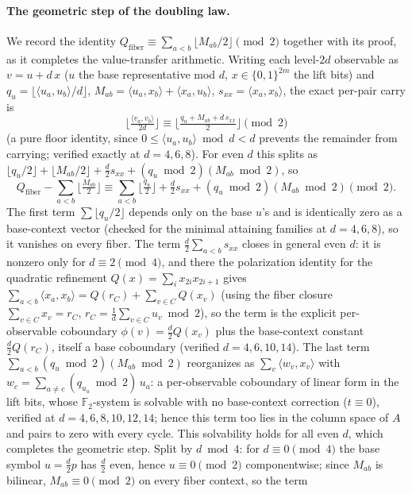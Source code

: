 \documentclass[11pt]{article}
\theoremstyle{remark}
\newcommand{\F}{\mathbb{F}}
\newcommand{\ip}[2]{\langle #1,#2\rangle}
\begin{document}
\paragraph{The geometric step of the doubling law.}
We record the identity $Q_{\mathrm{fiber}}\equiv\sum_{a<b}\lfloor M_{ab}/2\rfloor\pmod 2$ together with
its proof, as it completes the value-transfer arithmetic. Writing each level-$2d$ observable as
$v=u+d\,x$ ($u$ the base representative mod $d$, $x\in\{0,1\}^{2m}$ the lift bits) and
$q_u=\lfloor\ip{u_a}{u_b}/d\rfloor$, $M_{ab}=\ip{u_a}{x_b}+\ip{x_a}{u_b}$, $s_{xx}=\ip{x_a}{x_b}$, the
exact per-pair carry is
\[
\Big\lfloor\tfrac{\ip{v_a}{v_b}}{2d}\Big\rfloor\equiv\Big\lfloor\tfrac{q_u+M_{ab}+d\,s_{xx}}{2}
\Big\rfloor\pmod 2
\]
(a pure floor identity, since $0\le\ip{u_a}{u_b}\bmod d<d$ prevents the remainder from carrying;
verified exactly at $d=4,6,8$). For even $d$ this splits as
$\lfloor q_u/2\rfloor+\lfloor M_{ab}/2\rfloor+\tfrac d2 s_{xx}+(q_u\bmod 2)(M_{ab}\bmod 2)$, so
\[
Q_{\mathrm{fiber}}-\sum_{a<b}\big\lfloor\tfrac{M_{ab}}{2}\big\rfloor\equiv\sum_{a<b}
\big\lfloor\tfrac{q_u}{2}\big\rfloor+\tfrac d2 s_{xx}+(q_u\bmod 2)(M_{ab}\bmod 2)\pmod 2.
\]
The first term $\sum\lfloor q_u/2\rfloor$ depends only on the base $u$'s and is identically zero as a
base-context vector (checked for the minimal attaining families at $d=4,6,8$), so it vanishes on every
fiber. The term $\tfrac d2\sum_{a<b}s_{xx}$ closes in general even $d$: it is nonzero only for
$d\equiv 2\pmod 4$, and there the polarization identity for the quadratic refinement
$Q(x)=\sum_i x_{2i}x_{2i+1}$ gives $\sum_{a<b}\ip{x_a}{x_b}=Q(r_C)+\sum_{v\in C}Q(x_v)$ (using the
fiber closure $\sum_{v\in C}x_v=r_C$, $r_C=\tfrac1d\sum_{v\in C}u_v\bmod 2$), so the term is the
explicit per-observable coboundary $\phi(v)=\tfrac d2 Q(x_v)$ plus the base-context constant
$\tfrac d2 Q(r_C)$, itself a base coboundary (verified $d=4,6,10,14$). The last term
$\sum_{a<b}(q_u\bmod 2)(M_{ab}\bmod 2)$ reorganizes as $\sum_v\ip{w_v}{x_v}$ with
$w_c=\sum_{a\neq c}(q_{u_a}\bmod 2)\,u_a$: a per-observable coboundary of linear form in the lift bits,
whose $\F_2$-system is solvable with no base-context correction ($t\equiv 0$), verified at
$d=4,6,8,10,12,14$; hence this term too lies in the column space of $A$ and pairs to zero with every
cycle. This solvability holds for all even $d$, which completes the geometric step. Split by $d\bmod 4$:
for $d\equiv 0\pmod 4$ the base symbol $u=\tfrac d2 p$ has $\tfrac d2$ even, hence $u\equiv 0\pmod 2$
componentwise; since $M_{ab}$ is bilinear, $M_{ab}\equiv 0\pmod 2$ on every fiber context, so the term
\end{document}
